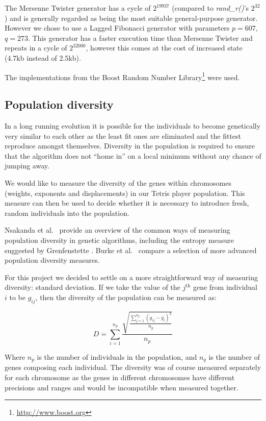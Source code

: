 \documentclass[a4paper,11pt]{article}
\begin{document}
The Mersenne Twister \cite{matsumoto1998mersenne} generator has a cycle of
$2^{19937}$ (compared to \emph{rand\_r()}'s $2^{32}$) and is generally regarded as
being the most suitable general-purpose generator.
However we chose to use a Lagged Fibonacci \cite{brent1992uniform} generator
with parameters $p=607$, $q=273$.
This generator has a faster execution time than Mersenne Twister and repeats in
a cycle of $2^{32000}$, however this comes at the cost of increased state (4.7kb
instead of 2.5kb).

The implementations from the Boost Random Number
Library\footnote{\url{http://www.boost.org}} were used.

\subsection{Population diversity}

In a long running evolution it is possible for the individuals to become
genetically very similar to each other as the least fit ones are eliminated and
the fittest reproduce amongst themselves.
Diversity in the population is required to ensure that the algorithm does not
``home in'' on a local minimum without any chance of jumping away.

We would like to measure the diversity of the genes within chromosomes (weights,
exponents and displacements) in our Tetris player population.
This measure can then be used to decide whether it is necessary to introduce
fresh, random individuals into the population.

Nsakanda et al.\ \cite{nsakanda2007ensuring} provide an overview of the common
ways of measuring population diversity in genetic algorithms, including the
entropy measure suggested by Grenfenstette \cite{grefenstette1987incorporating}.
Burke et al.\ \cite{burke2003advanced} compare a selection of more advanced
population diversity measures.

For this project we decided to settle on a more straightforward way of measuring
diversity: standard deviation.
If we take the value of the $j^\textrm{th}$ gene from individual $i$ to be
$g_{ij}$, then the diversity of the population can be measured as:

\begin{equation}
  D = \sum_{i=1}^{n_p} \frac{\sqrt{\frac{\sum_{j=1}^{n_g} (g_{ij} - \overline{g_i})^2 }{n_g}} }{n_p}
\end{equation}

Where $n_p$ is the number of individuals in the population, and $n_g$ is the
number of genes composing each individual.
The diversity was of course measured separately for each chromosome as the
genes in different chromosomes have different precisions and ranges and would be
incompatible when measured together.
\end{document}
